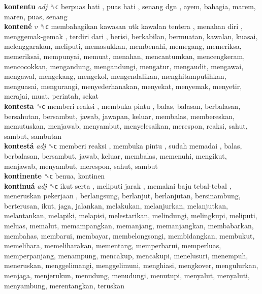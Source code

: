 \textbf{kontentu} \emph{adj}  ␝ϲ   berpuas hati ,  puas hati ,  senang dgn , ayem, bahagia, marem, maren, puas, senang  \\
\textbf{kontené} \emph{v}  ␝ϲ   membahagikan kawasan utk kawalan tentera ,  menahan diri ,  menggemak-gemak ,  terdiri dari , berisi, berkabilan, bermuatan, kawalan, kuasai, melenggarakan, meliputi, memasukkan, membenahi, memegang, memeriksa, memeriksai, mempunyai, memuat, menahan, mencantumkan, mencengkeram, mencocokkan, mengandung, mengandungi, mengatur, mengaudit, mengawai, mengawal, mengekang, mengekol, mengendalikan, menghitamputihkan, menguasai, mengurangi, menyederhanakan, menyekat, menyemak, menyetir, merajai, muat, perintah, sekat  \\
\textbf{kontesta} ␝ϲ   memberi reaksi ,  membuka pintu , balas, balasan, berbalasan, bersahutan, bersambut, jawab, jawapan, keluar, membalas, membereskan, memutuskan, menjawab, menyambut, menyelesaikan, merespon, reaksi, sahut, sambut, sambutan  \\
\textbf{kontestá} \emph{adj}  ␝ϲ   memberi reaksi ,  membuka pintu ,  sudah memadai , balas, berbalasan, bersambut, jawab, keluar, membalas, memenuhi, mengikut, menjawab, menyambut, merespon, sahut, sambut  \\
\textbf{kontinente} ␝ϲ  benua, kontinen  \\
\textbf{kontinuá} \emph{adj}  ␝ϲ   ikut serta ,  meliputi jarak ,  memakai baju tebal-tebal ,  meneruskan pekerjaan , berlangsung, berlanjut, berlanjutan, bersinambung, berterusan, ikut, jaga, jalankan, melakukan, melanjurkan, melanjutkan, melantankan, melapiki, melapisi, melestarikan, melindungi, melingkupi, meliputi, meluas, memalut, memampangkan, memanjang, memanjangkan, membabarkan, membahas, membarui, membayar, membelongsongi, membidangkan, membukut, memelihara, memeliharakan, mementang, memperbarui, memperluas, memperpanjang, menampung, mencakup, mencakupi, menelusuri, menempuh, meneruskan, menggelimangi, menggelimuni, menghiasi, mengkover, mengulurkan, menjaga, menjerukun, menudung, menudungi, menutupi, menyalut, menyaluti, menyambung, merentangkan, teruskan  \\
